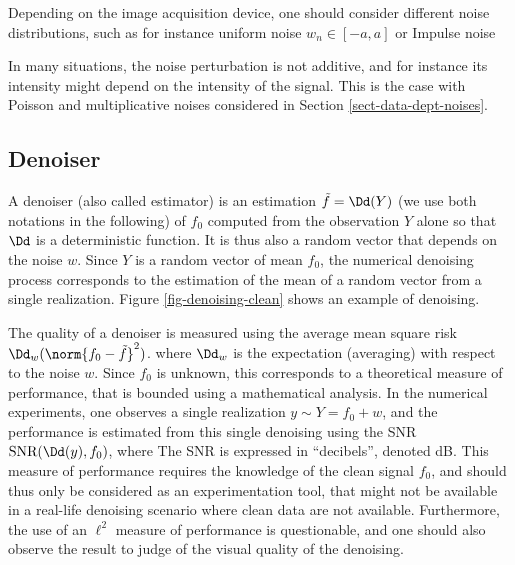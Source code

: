 Depending on the image acquisition device, one should consider different noise distributions, such as for instance uniform noise $w_n \in [-a,a]$ or Impulse noise

In many situations, the noise perturbation is not additive, and for instance its intensity might depend on the intensity of the signal. This is the case with Poisson and multiplicative noises considered in Section \ref{sect-data-dept-noises}.


\subsection{Denoiser}

A denoiser (also called estimator) is an estimation $\tilde f = \Dd(Y)$ (we use both notations in the following) of $f_0$ computed from the observation $Y$ alone so that $\Dd$ is a deterministic function. It is thus also a random vector that depends on the noise $w$. Since $Y$ is a random vector of mean $f_0$, the numerical denoising process corresponds to the estimation of the mean of a random vector from a single realization. Figure \ref{fig-denoising-clean} shows an example of denoising.

The quality of a denoiser is measured using the average mean square risk $\Dd_w(\norm{f_0-\tilde f}^2)$.
where $\Dd_w$ is the expectation (averaging) with respect to the noise $w$. Since $f_0$ is unknown, this corresponds to a theoretical measure of performance, that is bounded using a mathematical analysis. In the numerical experiments, one observes a single realization $y \sim Y = f_0 + w$, and the performance is estimated from this single denoising using the SNR $\text{SNR}(\Dd(y),f_0)$,  where
%
The SNR is expressed in ``decibels'', denoted dB. This measure of performance requires the knowledge of the clean signal $f_0$, and should thus only be considered as an experimentation tool, that might not be available in a real-life denoising scenario where clean data are not available. Furthermore, the use of an $\ell^2$ measure of performance is questionable, and one should also observe the result to judge of the visual quality of the denoising.




